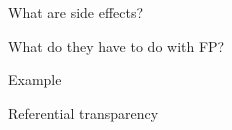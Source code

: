 \documentclass[aspectratio=169]{beamer}
\begin{document}
\begin{frame}
  \begin{center}
    \Huge What are side effects?
  \end{center}
\end{frame}

\begin{frame}
  \begin{center}
    \Huge What do they have to do with FP?
  \end{center}
\end{frame}

\begin{frame}
  \begin{center}
    \Huge Example
  \end{center}
\end{frame}

\begin{frame}
  \begin{center}
    \Huge Referential transparency
  \end{center}
\end{frame}
\end{document}
